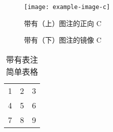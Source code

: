 \documentclass{ctexart}
\begin{document}
\begin{figure}
  \centering \caption{带有（上）图注的正向 C}
  \texttt{[image: example-image-c]}
\end{figure}
\begin{figure}
\centering {}
\caption{带有（下）图注的镜像 C}
\end{figure}
\begin{table}
\centering
  \begin{tabular}{| l c r |}
  \hline 1 & 2 & 3 \\ 4 & 5 & 6 \\ 7 & 8 & 9 \\ \hline
  \end{tabular}
\caption{带有表注简单表格}
\end{table}
\end{document}
